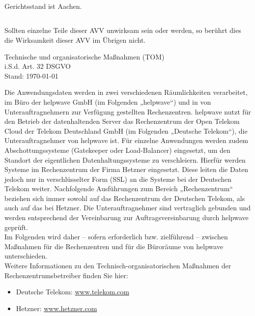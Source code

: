 \documentclass[10pt]{article}
\begin{document}
\subsection{} Gerichtsstand ist Aachen.
\subsection{} Sollten einzelne Teile dieser AVV unwirksam sein oder werden, so berührt dies die
Wirksamkeit dieser AVV im Übrigen nicht.

\newpage
\appendix
\setcounter{0}

\begin{center}
	\Huge Technische und organisatorische Maßnahmen (TOM) \\
	\Large i.S.d. Art. 32 DSGVO \\
	\small Stand: \today
\end{center}

Die Anwendungsdaten werden in zwei verschiedenen Räumlichkeiten verarbeitet, im Büro
der helpwave GmbH (im Folgenden „helpwave“) und in von Unterauftragnehmern
zur Verfügung gestellten Rechenzentren. helpwave nutzt für den Betrieb der datenhaltenden
Server das Rechenzentrum der Open Telekom Cloud der Telekom Deutschland GmbH (im
Folgenden „Deutsche Telekom“), die Unterauftragnehmer von helpwave ist. Für einzelne
Anwendungen werden zudem Abschottungssysteme (Gatekeeper oder Load-Balancer)
eingesetzt, um den Standort der eigentlichen Datenhaltungssysteme zu verschleiern. Hierfür
werden Systeme im Rechenzentrum der Firma Hetzner eingesetzt. Diese leiten die Daten
jedoch nur in verschlüsselter Form (SSL) an die Systeme bei der Deutschen Telekom weiter.
Nachfolgende Ausführungen zum Bereich „Rechenzentrum“ beziehen sich immer sowohl auf
das Rechenzentrum der Deutschen Telekom, als auch auf das bei Hetzner. Die
Unterauftragnehmer sind vertraglich gebunden und werden entsprechend der Vereinbarung
zur Auftragsvereinbarung durch helpwave geprüft.
\\

Im Folgenden wird daher – sofern erforderlich bzw. zielführend – zwischen Maßnahmen für
die Rechenzentren und für die Büroräume von helpwave unterschieden.
\\

Weitere Informationen zu den Technisch-organisatorischen Maßnahmen der
Rechenzentrumsbetreiber finden Sie hier: \\
\begin{itemize}
	\item Deutsche Telekom: \href{https://www.telekom.com/resource/blob/532978/d65e16421b37487e249f0ce4980117ad/dl-tom-1-data.pdf}{www.telekom.com} \\
	\item Hetzner: \href{https://www.hetzner.com/AV/TOM.pdf}{www.hetzner.com}\\
\end{itemize}
\end{document}
